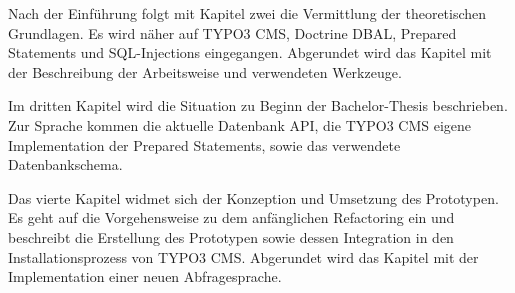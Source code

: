 Nach der Einführung folgt mit Kapitel zwei die Vermittlung der theoretischen Grundlagen. Es wird näher auf TYPO3 CMS, Doctrine DBAL, Prepared Statements und SQL-Injections eingegangen. Abgerundet wird das Kapitel mit der Beschreibung der Arbeitsweise und verwendeten Werkzeuge.

Im dritten Kapitel wird die Situation zu Beginn der Bachelor-Thesis beschrieben. Zur Sprache kommen die aktuelle Datenbank API, die TYPO3 CMS eigene Implementation der Prepared Statements, sowie das verwendete Datenbankschema.

Das vierte Kapitel widmet sich der Konzeption und Umsetzung des Prototypen. Es geht auf die Vorgehensweise zu dem anfänglichen Refactoring ein und beschreibt die Erstellung des Prototypen sowie dessen Integration in den Installationsprozess von TYPO3 CMS. Abgerundet wird das Kapitel mit der Implementation einer neuen Abfragesprache.




